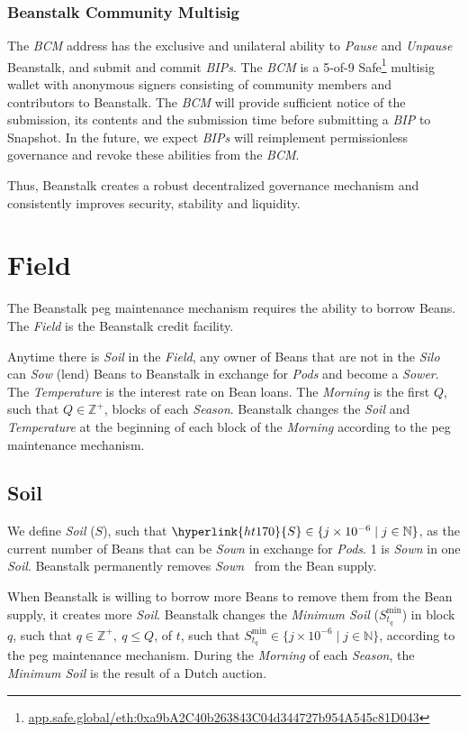 \documentclass[tikz]{article}
\newcommand{\term}[1]{\textsl{#1}}
\newcommand{\fref}[1]{\footnote{\href{http://#1}{#1}}}
\newcommand{\Bean}{} %
\begin{document}
\subsubsection{Beanstalk Community Multisig}
The \term{BCM} address has the exclusive and unilateral ability to \term{Pause} and \term{Unpause} Beanstalk, and submit and commit \term{BIPs}. The \term{BCM} is a 5-of-9 Safe\fref{app.safe.global/eth:0xa9bA2C40b263843C04d344727b954A545c81D043} multisig wallet with anonymous signers consisting of community members and contributors to Beanstalk. The \term{BCM} will provide sufficient notice of the submission, its contents and the submission time before submitting a \term{BIP} to Snapshot. In the future, we expect \term{BIPs} will reimplement permissionless governance and revoke these abilities from the \term{BCM}.

Thus, Beanstalk creates a robust decentralized governance mechanism and consistently improves security, stability and liquidity.

\section{Field}
\vspace*{-1mm}
The Beanstalk peg maintenance mechanism requires the ability to borrow Beans. The \term{Field} is the Beanstalk credit facility. 

Anytime there is \term{Soil} in the \term{Field}, any owner of Beans that are not in the \term{Silo} can \term{Sow} (lend) Beans to Beanstalk in exchange for \term{Pods} and become a \term{Sower}. The \term{Temperature} is the interest rate on Bean loans. The \term{Morning} is the first $Q$, such that ${Q} \in \mathbb{Z}^{+}$, blocks of each \term{Season}. Beanstalk changes the \term{Soil} and \term{Temperature} at the beginning of each block of the \term{Morning} according to the peg maintenance mechanism.

\subsection{Soil}
\vspace*{-1mm}
We define \term{Soil} (\hyperlink{ht170}{$S$}), such that $\hyperlink{ht170}{S} \in \{j \times 10^{-6} \mid j \in \mathbb{N} \}$, as the current number of Beans that can be \term{Sown} in exchange for \term{Pods}. \Bean1 is \term{Sown} in one \term{Soil}. Beanstalk permanently removes \term{Sown} \Bean\ from the Bean supply. 

When Beanstalk is willing to borrow more Beans to remove them from the Bean supply, it creates more \term{Soil}. Beanstalk changes the \term{Minimum Soil} ($S_{t_q}^{\text{min}}$) in block $q$, such that $q \in \mathbb{Z}^{+},\ q \leq Q$, of $t$, such that $S_{t_q}^{\text{min}} \in \{j \times 10^{-6} \mid j \in \mathbb{N} \}$, according to the peg maintenance mechanism. During the \term{Morning} of each \term{Season}, the \term{Minimum Soil} is the result of a Dutch auction.
\end{document}
